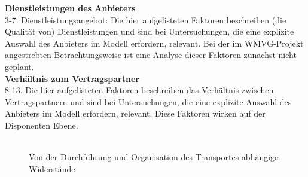 \textbf{Dienstleistungen des Anbieters}~\\
3-7. Dienstleistungsangebot: Die hier aufgelisteten Faktoren beschreiben (die Qualität von) Dienstleistungen und sind bei Untersuchungen, die eine explizite Auswahl des Anbieters im Modell erfordern, relevant. Bei der im WMVG-Projekt angestrebten Betrachtungsweise ist eine Analyse dieser Faktoren zunächst nicht geplant.~\\
\textbf{Verhältnis zum Vertragspartner}~\\
8-13. Die hier aufgelisteten Faktoren beschreiben das Verhältnis zwischen Vertragspartnern und sind bei Untersuchungen, die eine explizite Auswahl des Anbieters im Modell erfordern, relevant. Diese Faktoren wirken auf der Disponenten Ebene.~\\
~\\

\begin{figure}[htbp]
  \centering
  \caption{ Von der Durchführung und Organisation des Transportes abhängige Widerstände}
  \label{_Ref333934727}
\end{figure}
~\\
~\\


% 
